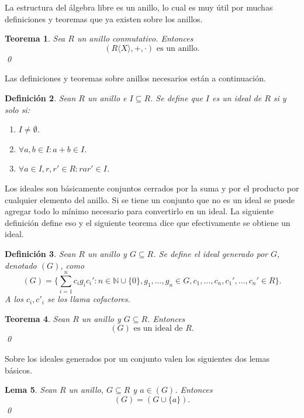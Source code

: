 \documentclass[12pt]{report}
\theoremstyle{customstyle}
\newtheorem{theorem}{Teorema}[chapter]
\newtheorem{definition}[theorem]{Definición}
\newtheorem{lemma}[theorem]{Lema}
\theoremstyle{factstyle}
\begin{document}
La estructura del álgebra libre es un anillo, lo cual es muy útil por muchas definiciones y teoremas que ya existen sobre los anillos.

\begin{theorem}
  Sea $R$ un anillo conmutativo. Entonces
  \[ (R⟨X⟩, +, ·)\text{ es un anillo} \text{.}\]
  \qed
\end{theorem}

Las definiciones y teoremas sobre anillos necesarios están a continuación.

\begin{definition}\label{def:ideal}
  Sean $R$ un anillo e $I ⊆ R$. Se define que $I$ es un ideal de $R$ si y solo si:
  \begin{enumerate}
    \item $I ≠ ∅$.
    \item $∀a, b ∈ I : a + b ∈ I$.
    \item $∀a ∈ I, r, r' ∈ R : r a r' ∈ I$.
  \end{enumerate}
\end{definition}

Los ideales son básicamente conjuntos cerrados por la suma y por el producto por cualquier elemento del anillo. Si se tiene un conjunto que no es un ideal se puede agregar todo lo mínimo necesario para convertirlo en un ideal. La siguiente definición define eso y el siguiente teorema dice que efectivamente se obtiene un ideal.

\begin{definition}\label{def:ideal gen}
  Sean $R$ un anillo y $G ⊆ R$. Se define el ideal generado por $G$, denotado $(G)$, como
  \[ (G) = \{∑_{i = 1}^n c_i g_i c_i' : n ∈ ℕ ∪ \{0\}, g_1, …, g_n ∈ G, c_1, …, c_n, c_1', …, c_n' ∈ R\} \text{.}\]
  A los $c_i, c'_i$ se los llama cofactores. %
\end{definition}

\begin{theorem}
  Sean $R$ un anillo y $G ⊆ R$. Entonces
  \[ (G)\text{ es un ideal de }R \text{.}\]
  \qed
\end{theorem}

Sobre los ideales generados por un conjunto valen los siguientes dos lemas básicos.

\begin{lemma}\label{lemma:gen G = gen G U a con a ∈ gen G}
  Sean $R$ un anillo, $G ⊆ R$ y $a ∈ (G)$. Entonces
  \[ (G) = (G ∪ \{a\}) \text{.}\]
  \qed
\end{lemma}
\end{document}
